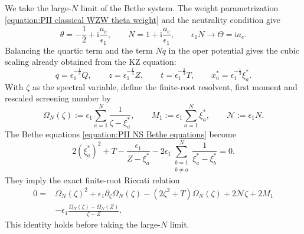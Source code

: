 \documentclass[a4paper,11pt]{article}
\numberwithin{equation}{section}
\begin{document}
We take the large-$N$ limit of the Bethe system.
The weight parametrization
\eqref{equation:PII classical WZW theta weight} and the
neutrality condition give
\begin{equation}
	\theta=-\frac{1}{2}+\mathrm{i}\frac{a_{e}}{\epsilon_{1}},
	\qquad N=1+\mathrm{i}\frac{a_{e}}{\epsilon_{1}},
	\qquad \epsilon_{1}N\longrightarrow\Theta=\mathrm{i}a_{e}.
\end{equation}
Balancing the quartic term and the term $Nq$ in the oper potential
gives the cubic scaling already obtained from the KZ equation:
\begin{equation}
	q=\epsilon_{1}^{-\frac{1}{3}}Q,
	\qquad z=\epsilon_{1}^{-\frac{1}{3}}Z,
	\qquad t=\epsilon_{1}^{-\frac{2}{3}}T,
	\qquad x_{a}^{*}=\epsilon_{1}^{-\frac{1}{3}}\xi_{a}^{*}.
\end{equation}
With $\zeta$ as the spectral variable, define the finite-root
resolvent, first moment and rescaled screening number by
\begin{equation}
	\Omega_{N}(\zeta):=\epsilon_{1}\sum_{a=1}^{N}\frac{1}{\zeta-\xi_{a}^{*}},
	\qquad M_{1}:=\epsilon_{1}\sum_{a=1}^{N}\xi_{a}^{*},
	\qquad \mathcal{N}:=\epsilon_{1}N.
\end{equation}
The Bethe equations \eqref{equation:PII NS Bethe equations} become
\begin{equation}
	2(\xi_{a}^{*})^{2}+T
	-\frac{\epsilon_{1}}{Z-\xi_{a}^{*}}
	-2\epsilon_{1}\sum_{\substack{b=1\\b\neq a}}^{N}
	\frac{1}{\xi_{a}^{*}-\xi_{b}^{*}}=0.
\end{equation}
They imply the exact finite-root Riccati relation
\begin{equation}
	\label{equation:PII NS scaled Riccati}
	\begin{aligned}
		0={}&\Omega_{N}(\zeta)^{2}
		+\epsilon_{1}\partial_{\zeta}\Omega_{N}(\zeta)
		-(2\zeta^{2}+T)\Omega_{N}(\zeta)+2\mathcal{N}\zeta+2M_{1}\\
		&-\epsilon_{1}\frac{\Omega_{N}(\zeta)-\Omega_{N}(Z)}{\zeta-Z}.
	\end{aligned}
\end{equation}
This identity holds before taking the large-$N$ limit.
\end{document}
